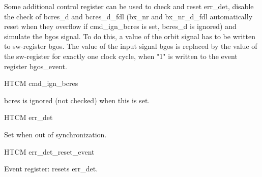 Some additional control register can be used to check and reset err\_det, disable the check of bcres\_d and bcres\_d\_fdl (bx\_nr and bx\_nr\_d\_fdl automatically reset when they overflow if cmd\_ign\_bcres is set, bcres\_d is ignored) and simulate the bgos signal. To do this, a value of the orbit signal has to be written to sw-register bgos. The value of the input signal bgos is replaced by the value of the sw-register for exactly one clock cycle, when "1" is written to the event register bgos\_event.

\begin{register}{H}{TCM cmd\_ign\_bcres}{}%
	\label{cmd_ign_bcres}%
	\regnewline%

	\begin{regdesc}
	\begin{reglist}
 		\item [cmd\_ign\_bcres] bcres is ignored (not checked) when this is set.
	\end{reglist}
	\end{regdesc}
\end{register}

\begin{register}{H}{TCM err\_det}{}%
	\label{err_det}%
	\regfield{err\_det}{1}{0}{0}%
	\regnewline%

	\begin{regdesc}
	\begin{reglist}
		\item [err\_det] Set when out of synchronization.
	\end{reglist}
	\end{regdesc}
\end{register}

\begin{register}{H}{TCM err\_det\_reset\_event}{}%
	\label{err_det_reset_event}%
	\regnewline%

	\begin{regdesc}
	\begin{reglist}
 		\item [err\_det\_reset\_event] Event register: resets err\_det.
	\end{reglist}
	\end{regdesc}
\end{register}

